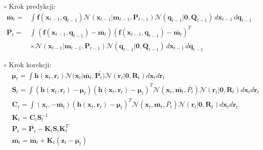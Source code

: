 \begin{itemize}
	\item[$\circ$] Krok predykcji:
	\begin{align}\label{eq:GaussianNonAdditivePredictionStep}
	\bar{\boldsymbol{m}_{t}} = &\int_{}^{}\boldsymbol{f}(\boldsymbol{x}_{t-1}, \boldsymbol{q}_{t-1})\mathcal{N}(\boldsymbol{x}_{t-1}|\boldsymbol{m}_{t-1}, \boldsymbol{P}_{t-1}) \mathcal{N}(\boldsymbol{q}_{t-1}|\boldsymbol{0}, \boldsymbol{Q}_{t-1}) \,d\boldsymbol{x}_{t-1} \,d\boldsymbol{q}_{t-1} \nonumber \\
	\bar{\mathbf{P}_{t}} = &\int_{}^{}(\boldsymbol{f}(\boldsymbol{x}_{t-1}, \boldsymbol{q}_{t-1}) - \bar{ \boldsymbol{m}_{t}})(\boldsymbol{f}(\boldsymbol{x}_{t-1}, \boldsymbol{q}_{t-1}) - \bar{ \boldsymbol{m}_{t}})^T \nonumber \\ &\times \mathcal{N}(\boldsymbol{x}_{t-1}|\boldsymbol{m}_{t-1}, \boldsymbol{P}_{t-1})\mathcal{N}(\boldsymbol{q}_{t-1}|\boldsymbol{0}, \boldsymbol{Q}_{t-1}) \,d\boldsymbol{x}_{t-1} \,d\boldsymbol{q}_{t-1}
	\end{align}
	\item[$\circ$] Krok korekcji:
	\begin{align} \label{eq:GaussianNonAdditiveCorrectionStep}
	&\boldsymbol{\mu}_t=\int \boldsymbol{h}(\boldsymbol{x}_{t}, \boldsymbol{r}_t)\mathcal{N}(\boldsymbol{x}_{t}|\bar{ \boldsymbol{m}_{t}}, \bar{\boldsymbol{P}_{t})} \mathcal{N}(\boldsymbol{r}_{t}| \boldsymbol{0}, \boldsymbol{R}_{t}) d\boldsymbol{x}_{t} d\boldsymbol{r}_{t} \nonumber \\
	&\boldsymbol{S}_t=\int (\boldsymbol{h}(\boldsymbol{x}_{t}, \boldsymbol{r}_t)-\boldsymbol{\mu}_t)(\boldsymbol{h}(\boldsymbol{x}_{t}, \boldsymbol{r}_t)-\boldsymbol{\mu}_t)^T\mathcal{N}(\boldsymbol{x}_{t}, \bar{\boldsymbol{m}_{t}}, \bar{P_{t}}) \mathcal{N}(\boldsymbol{r}_{t}| \boldsymbol{0}, \boldsymbol{R}_{t}) d\boldsymbol{x}_{t} d\boldsymbol{r}_{t} \nonumber \\
	&\boldsymbol{C}_t=\int (\boldsymbol{x}_{t}, -\bar{\boldsymbol{m}_t})(\boldsymbol{h}(\boldsymbol{x}_{t}, \boldsymbol{r}_t)-\boldsymbol{\mu}_t)^T\mathcal{N}(\boldsymbol{x}_{t}, \bar{\boldsymbol{m}_{t}}, \bar{P_{t}}) \mathcal{N}(\boldsymbol{r}_{t}| \boldsymbol{0}, \boldsymbol{R}_{t}) d\boldsymbol{x}_{t} d\boldsymbol{r}_{t} \nonumber \\
	&\boldsymbol{K}_t=\boldsymbol{C}_t\boldsymbol{S}_t^{-1} \nonumber \\
	&\boldsymbol{P}_t=\bar{\mathbf{P}_{t}} - \boldsymbol{K}_t\boldsymbol{S}_t\boldsymbol{K}_t^T \nonumber \\
	&\boldsymbol{m}_t = \bar{\boldsymbol{m}_t} + \boldsymbol{K}_t(\boldsymbol{z}_t - \boldsymbol{\mu}_t)
	\end{align}
\end{itemize}
